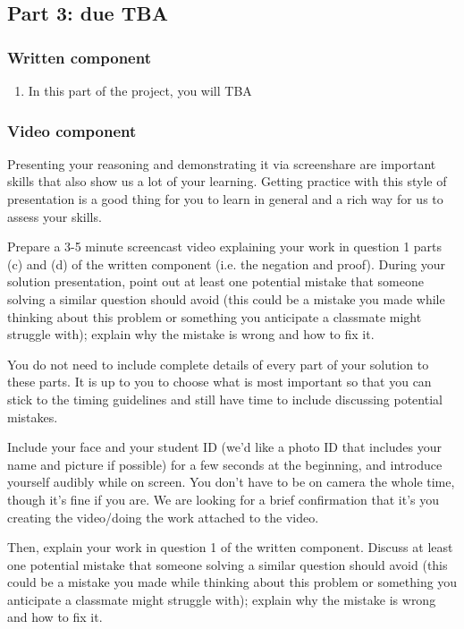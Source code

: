 \newpage
\subsection*{Part 3: due TBA}
\subsubsection*{Written component}
\begin{enumerate}
    \item In this part of the project, you will TBA
\end{enumerate}

\subsubsection*{Video component}
Presenting your reasoning and demonstrating it via screenshare are important skills that 
also show us a lot of your learning. Getting practice with this style of presentation 
is a good thing for you to learn in general and a rich way for us to assess your skills. 

Prepare a 3-5 minute screencast video explaining your work in question 1 parts (c) and (d)
of the written component (i.e. the negation and proof).
During your solution presentation, point out at least one potential mistake that someone 
solving a similar question should avoid (this could be a mistake you made while thinking 
about this problem or something you anticipate a classmate might struggle with); 
explain why the mistake is wrong and how to fix it. 

You do not need to include complete details of every part of your solution to these parts. 
It is up to you to choose what is most important so that you can stick to the 
timing guidelines and still have time to include discussing potential mistakes.

Include your face and your student ID (we'd like a photo ID that includes your name 
and picture if possible) for a few seconds at the beginning, and introduce yourself 
audibly while on screen. You don't have to be on camera the whole time, though it's fine 
if you are. We are looking for a brief confirmation that it's you creating the 
video/doing the work attached to the video.

Then, explain your work in question 1 of the written component.
Discuss at least one potential mistake that someone solving 
a similar question should avoid (this could be a mistake you made while thinking about this 
problem or something you anticipate a classmate might struggle with); explain why the 
mistake is wrong and how to fix it.
 
